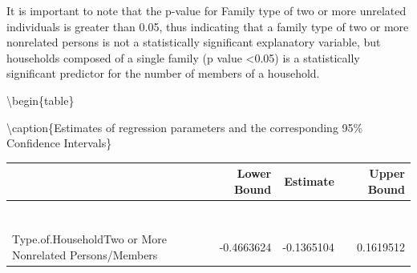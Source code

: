 \documentclass[
]{article}
\begin{document}
It is important to note that the p-value for Family type of two or more
unrelated individuals is greater than 0.05, thus indicating that a
family type of two or more nonrelated persons is not a statistically
significant explanatory variable, but households composed of a single
family (p value \textless0.05) is a statistically significant predictor
for the number of members of a household.

\textbackslash begin\{table\}

\textbackslash caption\{\label{tab:table of estimates and confidence intervals sig}Estimates
of regression parameters and the corresponding 95\% Confidence
Intervals\} \centering

\begin{tabular}[t]{l|r|r|r}
\hline
  & Lower Bound & Estimate & Upper Bound\\
\hline
\cellcolor[HTML]{A1E8F1}{\textcolor{black}{(Intercept)}} & \cellcolor[HTML]{A1E8F1}{\textcolor{black}{1.2992842}} & \cellcolor[HTML]{A1E8F1}{\textcolor{black}{1.4313832}} & \cellcolor[HTML]{A1E8F1}{\textcolor{black}{1.5630233}}\\
\hline
\cellcolor[HTML]{A1E8F1}{\textcolor{black}{Total.Household.Income}} & \cellcolor[HTML]{A1E8F1}{\textcolor{black}{-0.0040352}} & \cellcolor[HTML]{A1E8F1}{\textcolor{black}{-0.0028211}} & \cellcolor[HTML]{A1E8F1}{\textcolor{black}{-0.0016258}}\\
\hline
\cellcolor[HTML]{A1E8F1}{\textcolor{black}{Total.Food.Expenditure}} & \cellcolor[HTML]{A1E8F1}{\textcolor{black}{0.0434480}} & \cellcolor[HTML]{A1E8F1}{\textcolor{black}{0.0503772}} & \cellcolor[HTML]{A1E8F1}{\textcolor{black}{0.0572714}}\\
\hline
\cellcolor[HTML]{A1E8F1}{\textcolor{black}{Household.Head.Age}} & \cellcolor[HTML]{A1E8F1}{\textcolor{black}{-0.0044639}} & \cellcolor[HTML]{A1E8F1}{\textcolor{black}{-0.0027721}} & \cellcolor[HTML]{A1E8F1}{\textcolor{black}{-0.0010820}}\\
\hline
\cellcolor[HTML]{A1E8F1}{\textcolor{black}{House.Age}} & \cellcolor[HTML]{A1E8F1}{\textcolor{black}{-0.0039924}} & \cellcolor[HTML]{A1E8F1}{\textcolor{black}{-0.0024807}} & \cellcolor[HTML]{A1E8F1}{\textcolor{black}{-0.0009811}}\\
\hline
\cellcolor[HTML]{A1E8F1}{\textcolor{black}{Household.Head.SexMale}} & \cellcolor[HTML]{A1E8F1}{\textcolor{black}{0.1626469}} & \cellcolor[HTML]{A1E8F1}{\textcolor{black}{0.2205681}} & \cellcolor[HTML]{A1E8F1}{\textcolor{black}{0.2791383}}\\
\hline
\cellcolor[HTML]{A1E8F1}{\textcolor{black}{Type.of.HouseholdSingle Family}} & \cellcolor[HTML]{A1E8F1}{\textcolor{black}{-0.3969151}} & \cellcolor[HTML]{A1E8F1}{\textcolor{black}{-0.3484617}} & \cellcolor[HTML]{A1E8F1}{\textcolor{black}{-0.2999140}}\\
\hline
Type.of.HouseholdTwo or More Nonrelated Persons/Members & -0.4663624 & -0.1365104 & 0.1619512\\
\hline
\end{tabular}
\end{document}
